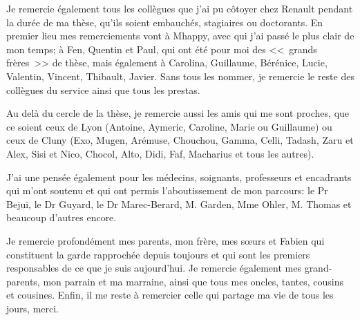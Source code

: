 \par Je remercie également tous les collègues que j'ai pu côtoyer chez Renault pendant la durée de ma thèse, qu'ils soient embauchés, stagiaires ou doctorants. En premier lieu mes remerciements vont à Mhappy, avec qui j'ai passé le plus clair de mon temps; à Fen, Quentin et Paul, qui ont été pour moi des <<~grands frères~>> de thèse, mais également à Carolina, Guillaume, Bérénice, Lucie, Valentin, Vincent, Thibault, Javier. Sans tous les nommer, je remercie le reste des collègues du service ainsi que tous les prestas.

\par Au delà du cercle de la thèse, je remercie aussi les amis qui me sont proches, que ce soient ceux de Lyon (Antoine, Aymeric, Caroline, Marie ou Guillaume) ou ceux de Cluny (Exo, Mugen, Arémuse, Chouchou, Gamma, Celli, Tadash, Zaru et Alex, Sisi et Nico, Chocol, Alto, Didi, Faf, Macharius et tous les autres).

\par J'ai une pensée également pour les médecins, soignants, professeurs et encadrants qui m'ont soutenu et qui ont permis l'aboutissement de mon parcours: le Pr Bejui, le Dr Guyard, le Dr Marec-Berard, M. Garden, Mme Ohler, M. Thomas et beaucoup d'autres encore. 

\par Je remercie profondément mes parents, mon frère, mes sœurs et Fabien qui constituent la garde rapprochée depuis toujours et qui sont les premiers responsables de ce que je suis aujourd'hui. Je remercie également mes grand-parents, mon parrain et ma marraine, ainsi que tous mes oncles, tantes, cousins et cousines. Enfin, il me reste à remercier celle qui partage ma vie de tous les jours, merci.
